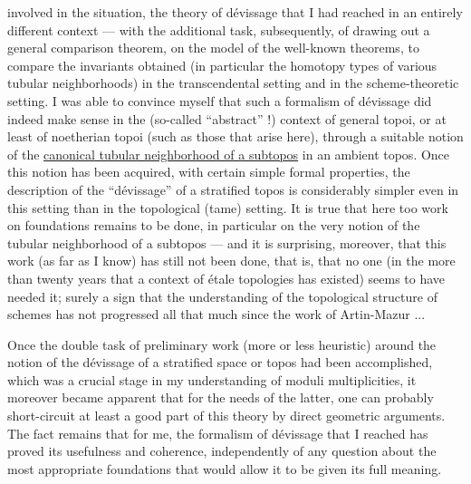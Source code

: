 
involved in the situation, the theory of dévissage that
I had reached in an entirely different context --- with the
additional task, subsequently, of drawing out a general comparison
theorem, on the model of the well-known theorems, to
compare the invariants obtained (in particular the homotopy types of
various tubular neighborhoods) in the transcendental setting and in
the scheme-theoretic setting. I was able to convince myself that such a formalism
of dévissage did indeed make sense in the (so-called
``abstract'' !) context of general topoi, or at least of noetherian
topoi (such as those that arise here), through a suitable
notion of the \uline{canonical tubular neighborhood of a subtopos} in an
ambient topos. Once this notion has been acquired, with certain simple
formal properties, the description of the ``dévissage'' of a
stratified topos is considerably simpler even in this
setting than in the topological (tame) setting. It is true that
here too work on foundations remains to be done, in particular on
the very notion of the tubular neighborhood of a subtopos --- and it is
surprising, moreover, that this work (as far as I know)
has still not been done, that is, that no one (in the more
than twenty years that a context of étale topologies has existed) seems
to have needed it; surely a sign that the understanding
of the topological structure of schemes has not progressed all that
much since the work of Artin-Mazur ...

Once the double task of preliminary work
(more or less heuristic) around the notion of the dévissage of a
stratified space or topos had been accomplished, which was a crucial stage in
my understanding of moduli multiplicities, it moreover
became apparent that for the needs of the latter, one can probably
short-circuit at least a good part of this theory by
direct geometric arguments. The fact remains that for
me, the formalism of dévissage that I reached has proved
its usefulness and coherence, independently of any
question about the most appropriate foundations that would allow
it to be given its full meaning.


